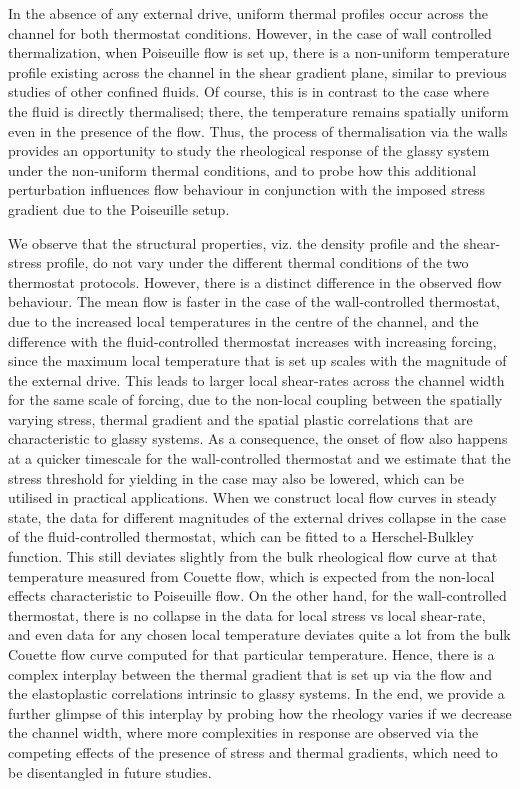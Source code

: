 In the absence of any external drive, uniform thermal profiles occur across the channel for both thermostat conditions. However, in the case of wall controlled thermalization, when Poiseuille flow is set up, there is a non-uniform temperature profile  existing across the channel in the shear gradient plane, similar to previous studies of other confined fluids. Of course, this is in contrast to the case where the fluid is directly thermalised; there, the temperature remains spatially uniform even in the presence of the flow. Thus, the process of thermalisation via the walls provides an opportunity to study the rheological response of the glassy system under the non-uniform thermal conditions, and to probe how this additional perturbation influences flow behaviour in conjunction with the imposed stress gradient due to the Poiseuille setup.

We observe that the structural properties, viz. the density profile and the shear-stress profile, do not vary under the different thermal conditions of the two thermostat protocols. However, there is a distinct difference in the observed flow behaviour. The mean flow is faster in the case of the wall-controlled thermostat, due to the increased local temperatures in the centre of the channel, and the difference with the fluid-controlled thermostat increases with increasing forcing, since the maximum local temperature that is set up scales with the magnitude of the external drive. This leads to larger local shear-rates across the channel width for the same scale of forcing, due to the non-local coupling between the spatially varying stress, thermal gradient and the spatial plastic correlations that are characteristic to glassy systems. As a consequence, the onset of flow also happens at a quicker timescale for the wall-controlled thermostat and we estimate that the stress threshold for yielding in the case may also be lowered, which can be utilised in practical applications. When we construct local flow curves in steady state, the data for different magnitudes of the external drives collapse in the case of the fluid-controlled thermostat, which can be fitted to a Herschel-Bulkley function. This still deviates slightly from the bulk rheological flow curve at that temperature measured from Couette flow, which is  expected from the non-local effects characteristic to Poiseuille flow. On the other hand, for the wall-controlled thermostat, there is no collapse in the data for local stress vs local shear-rate, and even data for any chosen local temperature deviates quite a lot from the bulk Couette flow curve computed for that particular  temperature. Hence, there is a complex interplay between the thermal gradient that is set up via the flow and the elastoplastic correlations intrinsic to glassy systems. In the end, we provide a further glimpse of this interplay by probing how the rheology varies if we decrease the channel width, where more complexities in response are observed via the competing effects of the presence of stress and thermal gradients, which need to be disentangled in future studies.

